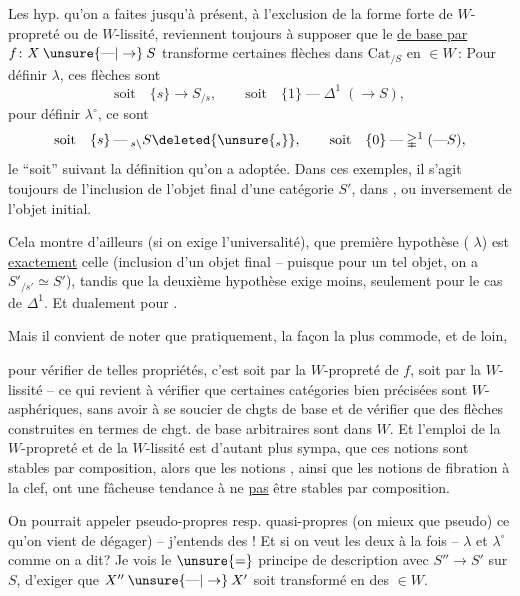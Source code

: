 Les hyp. qu'on a faites jusqu'à présent, à l'exclusion de la forme forte  de $W$-propreté ou de $W$-lissité, reviennent toujours à supposer que le \uline{ de base par} $f\colon X\mathbin{\unsure{\text{---}|\to}}S$ transforme certaines flèches dans $\mathrm{Cat}_{/S}$ en $\in W$\,: Pour définir $\lambda$, ces flèches sont
\[
\text{soit}\quad\{s\}\to S_{/s},\qquad\text{soit}\quad\{1\}\mathbin{\text{---}}\mathbb{\Delta}^{1}\;(\to S),
\]
pour définir $\lambda^\circ$, ce sont
\[
\text{soit}\quad\{s\}\mathbin{\text{---}}{}_{s\backslash}S\deleted{\unsure{_{s}}},\qquad\text{soit}\quad\{0\}\mathbin{\text{---}}\mathbb{\Delta}^1\;(\mathbin{\text{---}}S),
\]
le ``soit'' suivant la définition qu'on a adoptée. Dans ces exemples, il s'agit toujours de l'inclusion de l'objet final d'une catégorie $S'$, dans , ou inversement de l'objet initial.

Cela montre d'ailleurs (si on exige l'universalité), que  première hypothèse ( $\lambda$) est \uline{exactement} celle (inclusion d'un objet final  -- puisque pour un tel objet, on a $S'_{/s'}\simeq S'$), tandis que la deuxième hypothèse exige moins, seulement pour le cas de $\mathbb{\Delta}^1$. Et dualement pour \deleted{\unsure{$\lambda$}} .

Mais il convient de noter que pratiquement, la façon la plus commode, et de loin,


pour vérifier de telles propriétés, c'est soit par la $W$-propreté de $f$, soit par la $W$-lissité -- ce qui revient à vérifier que certaines catégories bien précisées sont $W$-asphériques, sans avoir à se soucier de chgts de base et de vérifier que des flèches construites en termes de chgt. de base arbitraires sont dans $W$. Et l'emploi de la $W$-propreté et de la $W$-lissité est d'autant plus sympa, que ces notions sont stables par composition, alors que  les notions , ainsi que les notions de fibration à la clef, ont une fâcheuse tendance à ne \uline{pas} être stables par composition.

On pourrait appeler pseudo-propres resp. quasi-propres (on  mieux que pseudo) ce qu'on vient de dégager) -- j'entends des ! Et si on veut les deux à la fois -- $\lambda$ et $\lambda^\circ$  comme on a dit? Je vois le $\unsure{=}$ principe de description avec  $S''\to S'$ sur $S$, d'exiger que $X''\mathbin{\unsure{\text{---}|\to}}X'$ soit transformé en des $\in W$.

